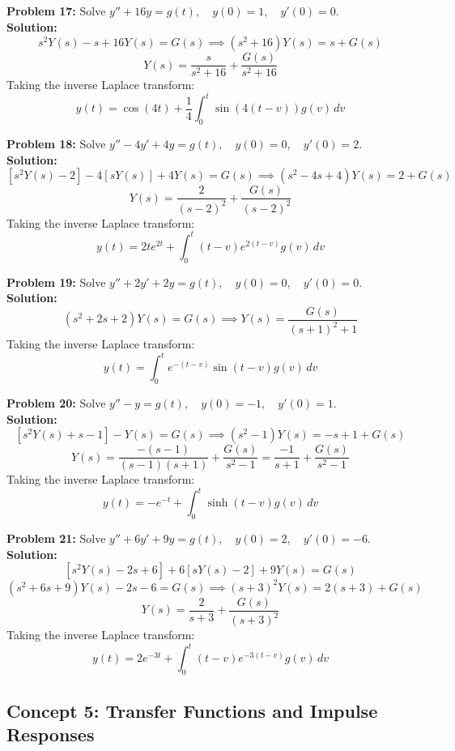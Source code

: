 \documentclass[11pt, letterpaper]{article}
\theoremstyle{definition}
\theoremstyle{remark}
\begin{document}
\textbf{Problem 17:} Solve $y'' + 16y = g(t), \quad y(0) = 1, \quad y'(0) = 0$.
\vspace{0.5em}\\
\textbf{Solution:}
\[ s^2Y(s) - s + 16Y(s) = G(s) \implies (s^2+16)Y(s) = s + G(s) \]
\[ Y(s) = \frac{s}{s^2+16} + \frac{G(s)}{s^2+16} \]
Taking the inverse Laplace transform:
\[ y(t) = \cos(4t) + \frac{1}{4} \int_0^t \sin(4(t-v))g(v) \, dv \]

\textbf{Problem 18:} Solve $y'' - 4y' + 4y = g(t), \quad y(0) = 0, \quad y'(0) = 2$.
\vspace{0.5em}\\
\textbf{Solution:}
\[ [s^2Y(s) - 2] - 4[sY(s)] + 4Y(s) = G(s) \implies (s^2-4s+4)Y(s) = 2 + G(s) \]
\[ Y(s) = \frac{2}{(s-2)^2} + \frac{G(s)}{(s-2)^2} \]
Taking the inverse Laplace transform:
\[ y(t) = 2te^{2t} + \int_0^t (t-v)e^{2(t-v)}g(v) \, dv \]

\textbf{Problem 19:} Solve $y'' + 2y' + 2y = g(t), \quad y(0) = 0, \quad y'(0) = 0$.
\vspace{0.5em}\\
\textbf{Solution:}
\[ (s^2+2s+2)Y(s) = G(s) \implies Y(s) = \frac{G(s)}{(s+1)^2+1} \]
Taking the inverse Laplace transform:
\[ y(t) = \int_0^t e^{-(t-v)}\sin(t-v)g(v) \, dv \]

\textbf{Problem 20:} Solve $y'' - y = g(t), \quad y(0) = -1, \quad y'(0) = 1$.
\vspace{0.5em}\\
\textbf{Solution:}
\[ [s^2Y(s) + s - 1] - Y(s) = G(s) \implies (s^2-1)Y(s) = -s + 1 + G(s) \]
\[ Y(s) = \frac{-(s-1)}{(s-1)(s+1)} + \frac{G(s)}{s^2-1} = \frac{-1}{s+1} + \frac{G(s)}{s^2-1} \]
Taking the inverse Laplace transform:
\[ y(t) = -e^{-t} + \int_0^t \sinh(t-v)g(v) \, dv \]

\textbf{Problem 21:} Solve $y'' + 6y' + 9y = g(t), \quad y(0) = 2, \quad y'(0) = -6$.
\vspace{0.5em}\\
\textbf{Solution:}
\[ [s^2Y(s) - 2s + 6] + 6[sY(s) - 2] + 9Y(s) = G(s) \]
\[ (s^2+6s+9)Y(s) - 2s - 6 = G(s) \implies (s+3)^2Y(s) = 2(s+3) + G(s) \]
\[ Y(s) = \frac{2}{s+3} + \frac{G(s)}{(s+3)^2} \]
Taking the inverse Laplace transform:
\[ y(t) = 2e^{-3t} + \int_0^t (t-v)e^{-3(t-v)}g(v) \, dv \]

\subsection{Concept 5: Transfer Functions and Impulse Responses}
\end{document}
